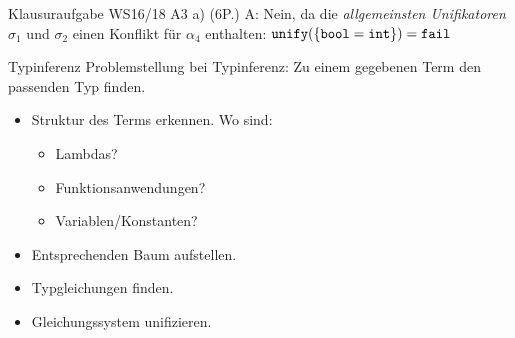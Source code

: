 \documentclass{beamer}
\begin{document}
\begin{frame}{Klausuraufgabe WS16/18 A3 a) (6P.)}
{    A: Nein, da die \emph{allgemeinsten Unifikatoren} $\sigma_1$ und $\sigma_2$ einen Konflikt für $\alpha_4$ enthalten:
    $\texttt{unify}(\{ \texttt{bool} = \texttt{int} \}) = \texttt{fail}$
  }

\end{frame}

\begin{frame}{Typinferenz}
  Problemstellung bei Typinferenz: Zu einem gegebenen Term den passenden Typ finden.

  \begin{itemize}
    \item Struktur des Terms erkennen. Wo sind:
    \begin{itemize}
      \item Lambdas?
      \item Funktionsanwendungen?
      \item Variablen/Konstanten?
    \end{itemize}
    \item Entsprechenden Baum aufstellen.
    \item Typgleichungen finden.
    \item Gleichungssystem unifizieren.
  \end{itemize}
\end{frame}

\newcommand{\tikzmark}[3]{\tikz[baseline, remember picture]{
	\node[fill=#1,draw] (#2) {#3};
}}
\end{document}
